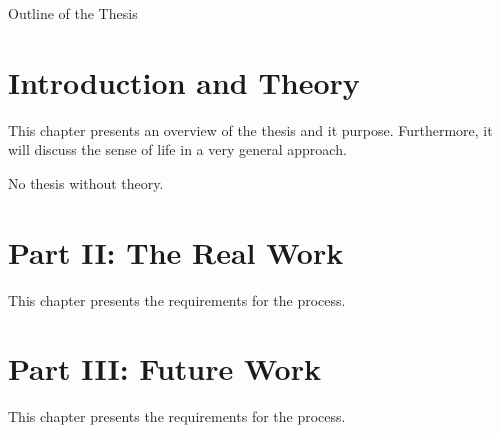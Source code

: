 \clearemptydoublepage

{}

\begin{center}
	\huge{Outline of the Thesis}
\end{center}


\section*{Introduction and Theory}

  \vspace{1mm}

\noindent  This chapter presents an overview of the thesis and it purpose. Furthermore, it will discuss the sense of life in a very general approach.  

  \vspace{1mm}

\noindent  No thesis without theory.   \vspace{1mm}

\section*{Part II: The Real Work}

  \vspace{1mm}

\noindent  This chapter presents the requirements for the process.
\section*{Part III: Future Work}

  \vspace{1mm}

\noindent  This chapter presents the requirements for the process.
